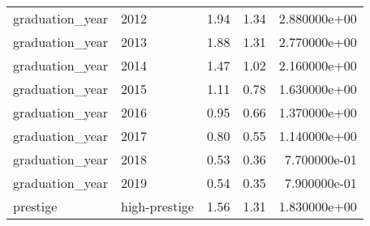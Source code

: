 \begin{table}
\begin{tabular}[t]{llrrr}
graduation\_year & 2012 & 1.94 & 1.34 & 2.880000e+00\\
graduation\_year & 2013 & 1.88 & 1.31 & 2.770000e+00\\
graduation\_year & 2014 & 1.47 & 1.02 & 2.160000e+00\\
\addlinespace
graduation\_year & 2015 & 1.11 & 0.78 & 1.630000e+00\\
graduation\_year & 2016 & 0.95 & 0.66 & 1.370000e+00\\
graduation\_year & 2017 & 0.80 & 0.55 & 1.140000e+00\\
graduation\_year & 2018 & 0.53 & 0.36 & 7.700000e-01\\
graduation\_year & 2019 & 0.54 & 0.35 & 7.900000e-01\\
\addlinespace
prestige & high-prestige & 1.56 & 1.31 & 1.830000e+00\\
\bottomrule
\end{tabular}
\end{table}
